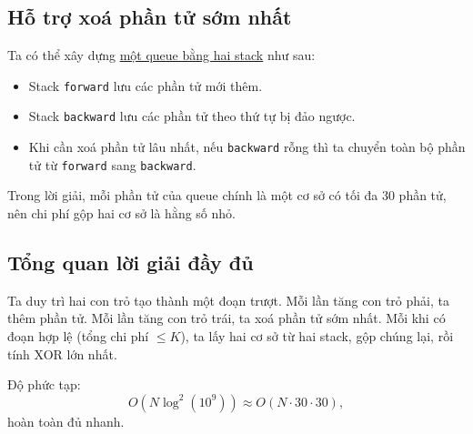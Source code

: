 \subsection*{Hỗ trợ xoá phần tử sớm nhất}

Ta có thể xây dựng \href{https://cp-algorithms.com/data_structures/stack_queue_modification.html#queue-modification-method-3}{một queue bằng hai stack} như sau:

\begin{itemize}
    \item Stack \texttt{forward} lưu các phần tử mới thêm.
    \item Stack \texttt{backward} lưu các phần tử theo thứ tự bị đảo ngược.
    \item Khi cần xoá phần tử lâu nhất, nếu \texttt{backward} rỗng thì ta chuyển toàn bộ phần tử từ \texttt{forward} sang \texttt{backward}.
\end{itemize}

Trong lời giải, mỗi phần tử của queue chính là một cơ sở có tối đa 30 phần tử, nên chi phí gộp hai cơ sở là hằng số nhỏ.

\subsection*{Tổng quan lời giải đầy đủ}

Ta duy trì hai con trỏ tạo thành một đoạn trượt.  
Mỗi lần tăng con trỏ phải, ta thêm phần tử.  
Mỗi lần tăng con trỏ trái, ta xoá phần tử sớm nhất.  
Mỗi khi có đoạn hợp lệ (tổng chi phí $\le K$), ta lấy hai cơ sở từ hai stack, gộp chúng lại, rồi tính XOR lớn nhất.

Độ phức tạp:
\[
O(N \log^2(10^9)) \approx O(N \cdot 30 \cdot 30),
\]
hoàn toàn đủ nhanh.
